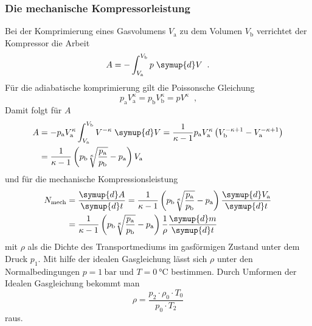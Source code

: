 \subsubsection{Die mechanische Kompressorleistung}
Bei der Komprimierung eines Gasvolumens $V_\text{a}$ zu dem Volumen $V_\text{b}$ 
verrichtet der Kompressor die Arbeit
\begin{equation}
    A = - \int^{V_\text{b}}_{V_\text{a}} p \; \symup{d}V \; \; \text{.}
\end{equation}
Für die adiabatische komprimierung gilt die Poissonsche Gleichung
\begin{equation}
    p_\text{a} V^\kappa_\text{a} = p_\text{b} V^\kappa_\text{b} = p V^\kappa \; \;
    \text{,}
\end{equation}
Damit folgt für $A$
\begin{equation}
    \begin{split}
        A &= - p_\text{a} V^\kappa_\text{a} \int^{V_\text{b}}_{V_\text{a}} V^{-\kappa}
        \; \symup{d}V = \frac{1}{\kappa - 1} p_\text{a} V^\kappa_\text{a} \left(
        V^{-\kappa + 1}_\text{b} - V^{-\kappa + 1}_\text{a} \right) \\
        &= \frac{1}{\kappa - 1} \left(p_\text{b} \sqrt[\kappa]{
        \frac{p_\text{a}}{p_\text{b}}} - p_\text{a}\right) V_\text{a}
    \end{split}
\end{equation}
und für die mechanische Kompressionsleistung
\begin{equation}
    \begin{split}
        N_\text{mech} &= \frac{\symup{d}A}{\symup{d}t} = \frac{1}{\kappa - 1}
        \left(p_\text{b} \sqrt[\kappa]{ \frac{p_\text{a}}{p_\text{b}}} 
        - p_\text{a} \right) \frac{\symup{d}V_\text{a}}{\symup{d}t} \\
        &= \frac{1}{\kappa - 1} \left(p_\text{b} \sqrt[\kappa]{ 
        \frac{p_\text{a}}{p_\text{b}}} - p_\text{a}\right) \frac{1}{\rho}
        \frac{\symup{d}m}{\symup{d}t}
        \label{eqn:Kompressor}
    \end{split}
\end{equation}
mit $\rho$ als die Dichte des Transportmediums im gasförmigen Zustand unter dem Druck $p_1$.
Mit hilfe der idealen Gasgleichung lässt sich $\rho$ unter den Normalbedingungen 
$p = \SI{1}{\bar}$ und $T = \SI{0}{\celsius}$ bestimmen.
Durch Umformen der Idealen Gasgleichung \cite{ggid} bekommt man 
\begin{equation}
    \rho= \frac{p_2\cdot \rho_0\cdot T_0}{p_0\cdot T_2}
    \label{eqn:gasgleichung}
\end{equation}
raus.